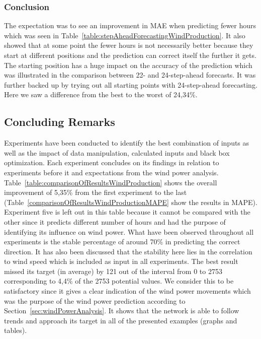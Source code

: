 \subsubsection{Conclusion}
The expectation was to see an improvement in MAE when predicting fewer hours which was seen in Table~\ref{table:stepAheadForecastingWindProduction}. It also showed that at some point the fewer hours is not necessarily better because they start at different positions and the prediction can correct itself the further it gets. The starting position has a huge impact on the accuracy of the prediction which was illustrated in the comparison between 22- and 24-step-ahead forecasts. It was further backed up by trying out all starting points with 24-step-ahead forecasting. Here we saw a difference from the best to the worst of 24,34\%.

\newpage
\subsection{Concluding Remarks}
Experiments have been conducted to identify the best combination of inputs as well as the impact of data manipulation, calculated inputs and black box optimization. Each experiment concludes on its findings in relation to experiments before it and expectations from the wind power analysis. Table~\ref{table:comparisonOfResultsWindProduction} shows the overall improvement of 5,35\% from the first experiment to the last (Table~\ref{comparisonOfResultsWindProductionMAPE} show the results in MAPE). Experiment five is left out in this table because it cannot be compared with the other since it predicts different number of hours and had the purpose of identifying its influence on wind power. What have been observed throughout all experiments is the stable percentage of around 70\% in predicting the correct direction. It has also been discussed that the stability here lies in the correlation to wind speed which is included as input in all experiments. The best result missed its target (in average) by 121 out of the interval from 0 to 2753 corresponding to 4,4\% of the 2753 potential values. We consider this to be satisfactory since it gives a clear indication of the wind power movements which was the purpose of the wind power prediction according to Section~\ref{sec:windPowerAnalysis}. It shows that the network is able to follow trends and approach its target in all of the presented examples (graphs and tables).

